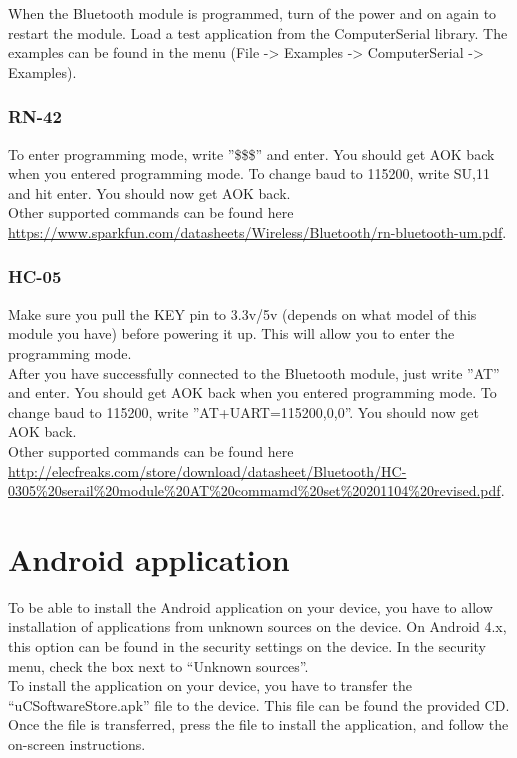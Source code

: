 			When the Bluetooth module is programmed, turn of the power and on again to restart the module. Load a test application from the ComputerSerial library. The examples can be found in the menu (File -> Examples -> ComputerSerial -> Examples).
			
				\subsubsection{RN-42}
				To enter programming mode, write ''\$\$\$'' and enter. You should get AOK back when you entered programming mode. To change baud to 115200, write SU,11 and hit enter. You should now get AOK back.\\
				
				Other supported commands can be found here \url{https://www.sparkfun.com/datasheets/Wireless/Bluetooth/rn-bluetooth-um.pdf}.

				\subsubsection{HC-05}
				Make sure you pull the KEY pin to 3.3v/5v (depends on what model of this module you have) before powering it up. This will allow you to enter the programming mode.\\
				
				After you have successfully connected to the Bluetooth module, just write ''AT'' and enter. You should get AOK back when you entered programming mode. To change baud to 115200, write ''AT+UART=115200,0,0''. You should now get AOK back.\\
				
				Other supported commands can be found here \url{http://elecfreaks.com/store/download/datasheet/Bluetooth/HC-0305%20serail%20module%20AT%20commamd%20set%20201104%20revised.pdf}.
				
	\section{Android application}\label{sec:install-android-application}
	To be able to install the Android application on your device, you have to allow installation of applications from unknown sources on the device. On Android 4.x, this option can be found in the security settings on the device. In the security menu, check the box next to ``Unknown sources''. \\

	To install the application on your device, you have to transfer the ``uCSoftwareStore.apk'' file to the device. This file can be found the provided CD. Once the file is transferred, press the file to install the application, and follow the on-screen instructions.
	
